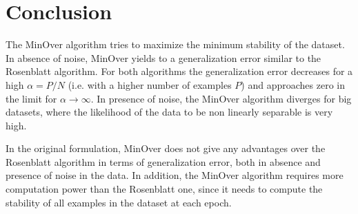 \section{Conclusion}
\label{sec:conclusion}

The MinOver algorithm tries to maximize the minimum stability of the dataset.
In absence of noise, MinOver yields to a generalization error similar to the Rosenblatt algorithm.
For both algorithms the generalization error decreases for a high $\alpha = P / N$ (i.e. with a higher number of examples $P$) and approaches zero in the limit for $\alpha \to \infty$.
In presence of noise, the MinOver algorithm diverges for big datasets, where the likelihood of the data to be non linearly separable is very high.

In the original formulation, MinOver does not give any advantages over the Rosenblatt algorithm in terms of generalization error, both in absence and presence of noise in the data.
In addition, the MinOver algorithm requires more computation power than the Rosenblatt one, since it needs to compute the stability of all examples in the dataset at each epoch.
